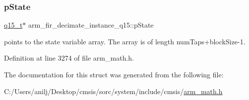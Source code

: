 \subsubsection{\texorpdfstring{p\+State}{pState}}
{\footnotesize\ttfamily \hyperlink{arm__math_8h_ab5a8fb21a5b3b983d5f54f31614052ea}{q15\+\_\+t}$\ast$ arm\+\_\+fir\+\_\+decimate\+\_\+instance\+\_\+q15\+::p\+State}

points to the state variable array. The array is of length num\+Taps+block\+Size-\/1. 

Definition at line 3274 of file arm\+\_\+math.\+h.



The documentation for this struct was generated from the following file\+:\begin{DoxyCompactItemize}
\item 
C\+:/\+Users/anilj/\+Desktop/cmsis/sorc/system/include/cmsis/\hyperlink{arm__math_8h}{arm\+\_\+math.\+h}\end{DoxyCompactItemize}

